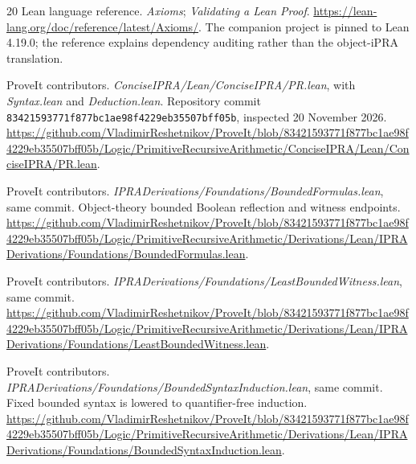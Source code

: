 \begin{thebibliography}{20}
Lean language reference. \emph{Axioms}; \emph{Validating a Lean Proof}.
\url{https://lean-lang.org/doc/reference/latest/Axioms/}.
The companion project is pinned to Lean 4.19.0; the reference explains
dependency auditing rather than the object-iPRA translation.

ProveIt contributors. \emph{ConciseIPRA/Lean/ConciseIPRA/PR.lean},
with \emph{Syntax.lean} and \emph{Deduction.lean}.
Repository commit \texttt{83421593771f877bc1ae98f4229eb35507bff05b},
inspected 20 November 2026.
\url{https://github.com/VladimirReshetnikov/ProveIt/blob/83421593771f877bc1ae98f4229eb35507bff05b/Logic/PrimitiveRecursiveArithmetic/ConciseIPRA/Lean/ConciseIPRA/PR.lean}.

ProveIt contributors. \emph{IPRADerivations/Foundations/BoundedFormulas.lean},
same commit. Object-theory bounded Boolean reflection and witness endpoints.
\url{https://github.com/VladimirReshetnikov/ProveIt/blob/83421593771f877bc1ae98f4229eb35507bff05b/Logic/PrimitiveRecursiveArithmetic/Derivations/Lean/IPRADerivations/Foundations/BoundedFormulas.lean}.

ProveIt contributors. \emph{IPRADerivations/Foundations/LeastBoundedWitness.lean},
same commit.
\url{https://github.com/VladimirReshetnikov/ProveIt/blob/83421593771f877bc1ae98f4229eb35507bff05b/Logic/PrimitiveRecursiveArithmetic/Derivations/Lean/IPRADerivations/Foundations/LeastBoundedWitness.lean}.

ProveIt contributors. \emph{IPRADerivations/Foundations/BoundedSyntaxInduction.lean},
same commit. Fixed bounded syntax is lowered to quantifier-free induction.
\url{https://github.com/VladimirReshetnikov/ProveIt/blob/83421593771f877bc1ae98f4229eb35507bff05b/Logic/PrimitiveRecursiveArithmetic/Derivations/Lean/IPRADerivations/Foundations/BoundedSyntaxInduction.lean}.
\end{thebibliography}
